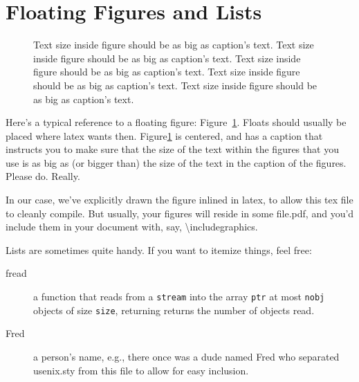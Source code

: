 \section{Floating Figures and Lists}
\label{sec:figs}


\begin{figure}
\begin{center}
\end{center}
\caption{\label{fig:vectors} Text size inside figure should be as big as
  caption's text. Text size inside figure should be as big as
  caption's text. Text size inside figure should be as big as
  caption's text. Text size inside figure should be as big as
  caption's text. Text size inside figure should be as big as
  caption's text. }
\end{figure}


Here's a typical reference to a floating figure:
Figure~\ref{fig:vectors}. Floats should usually be placed where latex
wants then. Figure\ref{fig:vectors} is centered, and has a caption
that instructs you to make sure that the size of the text within the
figures that you use is as big as (or bigger than) the size of the
text in the caption of the figures. Please do. Really.

In our case, we've explicitly drawn the figure inlined in latex, to
allow this tex file to cleanly compile. But usually, your figures will
reside in some file.pdf, and you'd include them in your document
with, say, \textbackslash{}includegraphics.

Lists are sometimes quite handy. If you want to itemize things, feel
free:

\begin{description}
  
\item[fread] a function that reads from a \texttt{stream} into the
  array \texttt{ptr} at most \texttt{nobj} objects of size
  \texttt{size}, returning returns the number of objects read.

\item[Fred] a person's name, e.g., there once was a dude named Fred
  who separated usenix.sty from this file to allow for easy
  inclusion.
\end{description}

